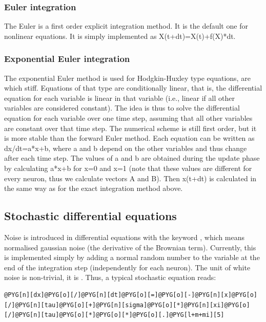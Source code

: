 \documentclass[letterpaper,10pt,english]{manual}
\begin{document}
\subsubsection{Euler integration}

The Euler is a first order explicit integration method. It is the default one for
nonlinear equations. It is simply implemented as X(t+dt)=X(t)+f(X)*dt.

\subsubsection{Exponential Euler integration}

The exponential Euler method is used for Hodgkin-Huxley type
equations, are which stiff.
Equations of that type are conditionally linear, that is, the differential equation
for each variable is linear in that variable (i.e., linear if all other variables
are considered constant).
The idea is thus to solve the differential equation for each variable over one time step,
assuming that all other variables are constant over that time step. The numerical scheme
is still first order, but it is more stable than the forward Euler method.
Each equation can be written as dx/dt=a*x+b, where a and b depend on the other variables
and thus change after each time step.
The values of a and b are obtained during the update phase by calculating a*x+b for x=0 and x=1
(note that these values are different for every neuron, thus we calculate vectors A and B).
Then x(t+dt) is calculated in the same way as for the exact integration method above.

\subsection{Stochastic differential equations}

Noise is introduced in differential equations with the keyword
, which means normalised gaussian noise (the derivative of the Brownian term).
Currently, this is implemented simply by adding a normal random number to the variable
at the end of the integration step (independently for each neuron).
The unit of white noise is non-trivial, it is . Thus, a typical stochastic
equation reads:

\begin{Verbatim}[commandchars=@\[\]]
@PYG[n][dx]@PYG[o][/]@PYG[n][dt]@PYG[o][=]@PYG[o][-]@PYG[n][x]@PYG[o][/]@PYG[n][tau]@PYG[o][+]@PYG[n][sigma]@PYG[o][*]@PYG[n][xi]@PYG[o][/]@PYG[n][tau]@PYG[o][*]@PYG[o][*]@PYG[o][.]@PYG[l+m+mi][5]
\end{Verbatim}
\end{document}
